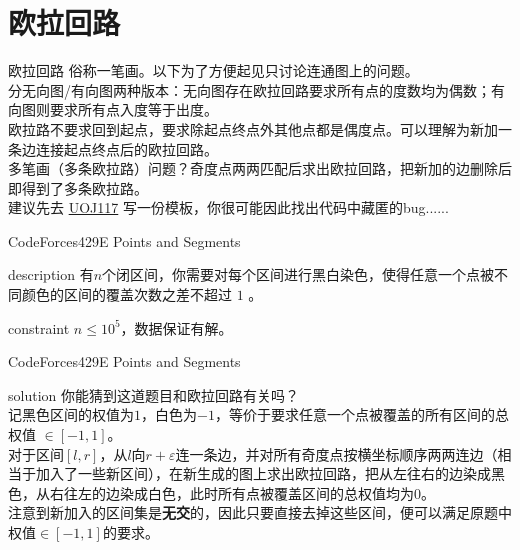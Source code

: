 \documentclass{beamer}
\def\le{\leqslant}
\begin{document}
\section{欧拉回路}
\begin{frame}{欧拉回路}
	俗称一笔画。以下为了方便起见只讨论连通图上的问题。\\
	
	分无向图/有向图两种版本：无向图存在欧拉回路要求所有点的度数均为偶数；有向图则要求所有点入度等于出度。\\
	
	欧拉路不要求回到起点，要求除起点终点外其他点都是偶度点。可以理解为新加一条边连接起点终点后的欧拉回路。\pause\\
	
	多笔画（多条欧拉路）问题？\pause 奇度点两两匹配后求出欧拉回路，把新加的边删除后即得到了多条欧拉路。\pause\\
	
	建议先去 \href{https://uoj.ac/problem/117}{UOJ117} 写一份模板，你很可能因此找出代码中藏匿的bug......
	
\end{frame}

\begin{frame}{CodeForces429E Points and Segments}
	\begin{block}{description}
		有$n$个闭区间，你需要对每个区间进行黑白染色，使得任意一个点被不同颜色的区间的覆盖次数之差不超过 $1$ 。
	\end{block}
	\begin{block}{constraint}
		$n \le 10^5$，数据保证有解。
	\end{block}
\end{frame}

\begin{frame}{CodeForces429E Points and Segments}
	\begin{block}{solution}
		你能猜到这道题目和欧拉回路有关吗？\\
		
		记黑色区间的权值为$1$，白色为$-1$，等价于要求任意一个点被覆盖的所有区间的总权值 $\in [-1,1]$。\\
		
		对于区间$[l,r]$，从$l$向$r+\varepsilon$连一条边，并对所有奇度点按横坐标顺序两两连边（相当于加入了一些新区间），在新生成的图上求出欧拉回路，把从左往右的边染成黑色，从右往左的边染成白色，此时所有点被覆盖区间的总权值均为$0$。\\
		
		注意到新加入的区间集是\textbf{无交}的，因此只要直接去掉这些区间，便可以满足原题中权值$\in[-1,1]$的要求。
		
	\end{block}
\end{frame}
\end{document}
